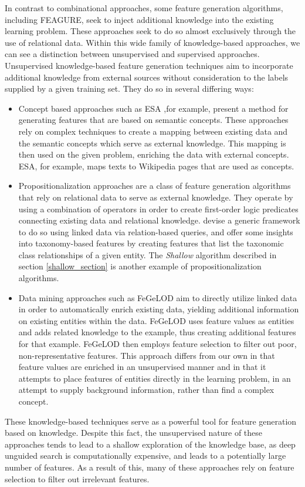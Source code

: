 \documentclass[twoside,11pt]{article}
\theoremstyle{definition}
\begin{document}
In contrast to combinational approaches, some feature generation algorithms, including FEAGURE, seek to inject additional knowledge into the existing learning problem. These approaches seek to do so almost exclusively through the use of relational data. 
Within this wide family of knowledge-based approaches, we can see a distinction between unsupervised and supervised approaches.
Unsupervised knowledge-based feature generation techniques aim to incorporate additional knowledge from external sources without consideration to the labels supplied by a given training set. They do so in several differing ways:
\begin{itemize}
	\item Concept based approaches such as ESA \cite{gabrilovich2009wikipediafull} ,for example, present a method for generating features that are based on semantic concepts. These approaches rely on complex techniques to create a mapping between existing data and the semantic concepts which serve as external knowledge. This mapping is then used on the given problem, enriching the data with external concepts. ESA, for example, maps texts to Wikipedia pages that are used as concepts.
	\item Propositionalization \cite{kramer2000bottom} approaches are a class of feature generation algorithms that rely on relational data to serve as external knowledge. They operate by using a combination of operators in order to create first-order logic predicates connecting existing data and relational knowledge. 
	 devise a generic framework to do so using linked data via relation-based queries, and offer some insights into taxonomy-based features by creating features that list the taxonomic class relationships of a given entity.
	The \emph{Shallow} algorithm described in section \ref{shallow_section} is another example of propositionalization algorithms.
	\item Data mining approaches such as FeGeLOD \cite{paulheim2012unsupervisedfull} aim to directly utilize linked data in order to automatically enrich existing data, yielding additional information on existing entities within the data. FeGeLOD uses feature values as entities and adds related knowledge to the example, thus creating additional features for that example. FeGeLOD then employs feature selection to filter out poor, non-representative features. This approach differs from our own in that feature values are enriched in an unsupervised manner and in that it attempts to place features of entities directly in the learning problem, in an attempt to supply background information, rather than find a complex concept.
\end{itemize}
These knowledge-based techniques serve as a powerful tool for feature generation based on knowledge. Despite this fact, the unsupervised nature of these approaches tends to lead to a shallow exploration of the knowledge base, as deep unguided search is computationally expensive, and leads to a potentially large number of features. As a result of this, many of these approaches rely on feature selection to filter out irrelevant features.
\end{document}
